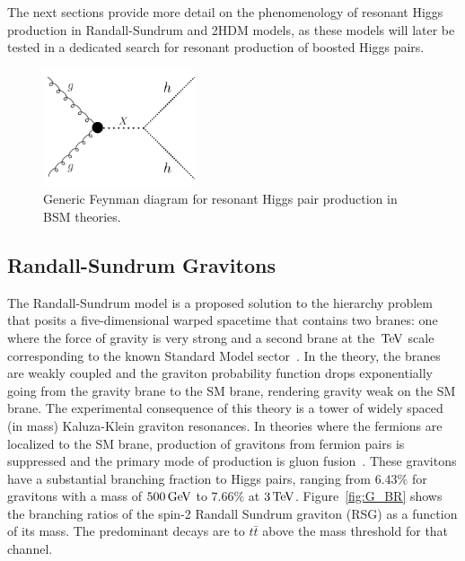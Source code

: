 %
The next sections provide more detail on the phenomenology of resonant Higgs production in Randall-Sundrum and 2HDM models, as these models will later be tested in a dedicated search for resonant production of boosted Higgs pairs. 
%
\begin{figure}[h!]
  \centering
  \captionsetup{justification=centering}

  \includegraphics[width=0.4\textwidth]{figures/Generic_res}
   \caption{Generic Feynman diagram for resonant Higgs pair production in BSM theories.}
  \label{fig:HH_res}
\end{figure}
%

\subsection{Randall-Sundrum Gravitons}

The Randall-Sundrum model is a proposed solution to the hierarchy problem that posits a five-dimensional warped spacetime that contains two branes: one where the force of gravity is very strong and a second brane at the $\TeV$ scale corresponding to the known Standard Model sector~\cite{RSG1}. In the theory, the branes are weakly coupled and the graviton probability function drops exponentially going from the gravity brane to the SM brane, rendering gravity weak on the SM brane. The experimental consequence of this theory is a tower of widely spaced (in mass) Kaluza-Klein graviton resonances. In theories where the fermions are localized to the SM brane, production of gravitons from fermion pairs is suppressed and the primary mode of production is gluon fusion~\cite{RSG_LHC}. These gravitons have a substantial branching fraction to Higgs pairs, ranging from $6.43$\% for gravitons with a mass of $500 \GeV$ to $7.66\%$ at $3 \TeV$. Figure~\ref{fig:G_BR} shows the branching ratios of the spin-2 Randall Sundrum graviton (RSG) as a function of its mass. The predominant decays are to $t\bar{t}$ above the mass threshold for that channel. 

